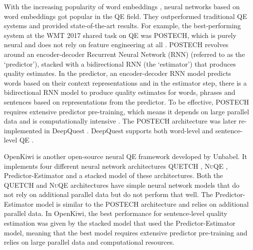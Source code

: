 With the increasing popularity of word embeddings \autocite{DBLP:journals/corr/abs-1301-3781}, neural networks based on word embeddings got popular in the QE field. They outperformed traditional QE systems and provided state-of-the-art results. For example, the best-performing system at the WMT 2017 shared task on QE was \textsc{POSTECH}, which is purely neural and does not rely on feature engineering at all \autocite{kim-etal-2017-predictor}. \textsc{POSTECH} revolves around an encoder-decoder Recurrent Neural Network (RNN) (referred to as the `predictor'), stacked with a bidirectional RNN (the `estimator') that produces quality estimates. In the predictor, an encoder-decoder RNN model predicts words based on their context representations and in the estimator step, there is a bidirectional RNN model to produce quality estimates for words, phrases and sentences based on representations from the predictor. To be effective, \textsc{POSTECH} requires extensive predictor pre-training, which means it depends on large parallel data and is computationally intensive \autocite{ive-etal-2018-deepquest}. The \textsc{POSTECH} architecture was later re-implemented in DeepQuest  \autocite{ive-etal-2018-deepquest}. DeepQuest supports both word-level and sentence-level QE \autocite{ive-etal-2018-deepquest}. 

OpenKiwi \autocite{kepler-etal-2019-openkiwi} is another open-source neural QE framework developed by Unbabel. It implements four different neural network architectures \textsc{QUETCH} \autocite{kreutzer-etal-2015-quality}, \textsc{NuQE} \autocite{martins-etal-2016-unbabels}, Predictor-Estimator \autocite{kim-etal-2017-predictor} and a stacked model of these architectures. Both the \textsc{QUETCH} and \textsc{NuQE} architectures have simple neural network models that do not rely on additional parallel data but do not perform that well. The Predictor-Estimator model is similar to the \textsc{POSTECH} architecture and relies on additional parallel data. In OpenKiwi, the best performance for sentence-level quality estimation was given by the stacked model that used the Predictor-Estimator model, meaning that the best model requires extensive predictor pre-training and relies on large parallel data and computational resources. 

